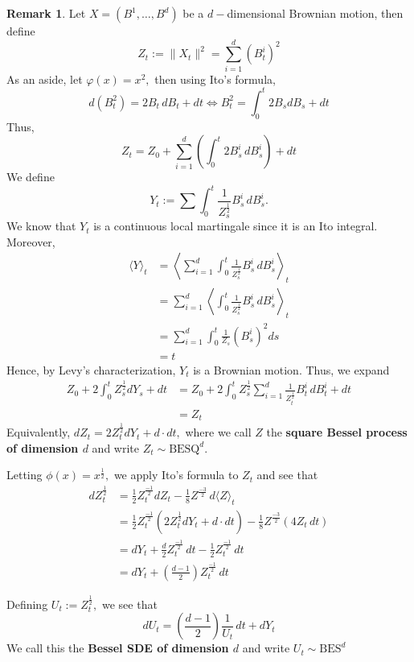 \documentclass[10pt, oneside]{article}
\theoremstyle{definition}
\newtheorem{rem}{Remark}
\begin{document}
\begin{rem}
    Let $X = (B^1, \dots, B^d)$ be a $d-$dimensional Brownian motion, then define
    \[Z_t := \|X_t\|^2 = \sum_{i=1}^d (B_t^i)^2\] As an aside, let $\varphi(x)= x^2,$ then using Ito's formula,
    \[d(B_t^2) = 2B_t \,dB_t + dt  \iff B_t^2 = \int_0^t2B_s dB_s + dt\] Thus, 
    \[Z_t =Z_0 +  \sum_{i=1}^d \left(\int_0^t 2B^i_s\,dB_s^i\right) + dt\] We define 
    \[Y_t:= \sum \int_0^t \frac{1}{Z_s^\frac{1}{2}}B_s^i \,dB_s^i.\] We know that $Y_t$ is a continuous local martingale since it is an Ito integral. Moreover, 
    \begin{align*}
    \langle Y\rangle_t &= \left\langle \sum_{i=1}^d \int_0^t \frac{1}{Z_s^\frac{1}{2}}B_s^i \,dB_s^i\right\rangle_t    \\
    &= \sum_{i=1}^d\left\langle \int_0^t \frac{1}{Z_s^\frac{1}{2}}B_s^i \,dB_s^i\right\rangle_t\\
    &= \sum_{i=1}^d \int_0^t \frac{1}{Z_s}(B_s^i)^2 ds\\
    &= t
    \end{align*}
    Hence, by Levy's characterization, $Y_t$ is a Brownian motion.
    Thus, we expand
    \begin{align*}
        Z_0 + 2\int_0^t Z_s^\frac{1}{2} dY_s + dt &= Z_0 + 2\int_0^t Z_s^\frac{1}{2} \sum_{i=1}^d \frac{1}{Z_t^\frac{1}{2}}B_t^i \,dB_t^i + dt\\
        &= Z_t
    \end{align*}
    Equivalently, $dZ_t = 2Z_t^\frac{1}{2}dY_t + d\cdot dt,$ where we call $Z$ the \textbf{square Bessel process of dimension $d$} and write $Z_t \sim \text{BESQ}^d$.

    Letting $\phi(x) = x^\frac{1}{2},$ we apply Ito's formula to $Z_t$ and see that 
    \begin{align*}
    dZ_t^\frac{1}{2} &= \frac{1}{2}Z_t^\frac{-1}{2}dZ_t - \frac{1}{8}Z^\frac{-3}{2} \,d\langle Z\rangle_t\\
    &= \frac{1}{2}Z_t^\frac{-1}{2}(2Z_t^\frac{1}{2}dY_t + d\cdot dt) - \frac{1}{8}Z^\frac{-3}{2} (4Z_t \,dt)\\
    &= dY_t + \frac{d}{2}Z_t^\frac{-1}{2}\,dt-\frac{1}{2}Z_t^\frac{-1}{2}\,dt\\
    &= dY_t + (\frac{d-1}{2})Z_t^\frac{-1}{2}\,dt
    \end{align*}

Defining $U_t:= Z_t^\frac{1}{2},$ we see that 
\[dU_t = (\frac{d-1}{2})\frac{1}{U_t}\,dt + dY_t\] We call this the \textbf{Bessel SDE of dimension $d$} and write $U_t \sim \text{BES}^d$
\end{rem}
\end{document}
